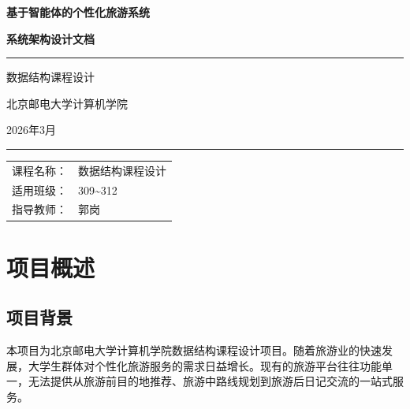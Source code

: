 \documentclass[12pt,a4paper]{report}
\begin{document}
\begin{titlepage}
\centering
\vspace*{3cm}

{\Huge\bfseries 基于智能体的个性化旅游系统}

\vspace{1.5cm}

{\LARGE\bfseries 系统架构设计文档}

\vspace{2cm}

\rule{\textwidth}{1pt}

\vspace{1cm}

{\Large 数据结构课程设计}

\vspace{0.5cm}

{\large 北京邮电大学计算机学院}

\vspace{0.3cm}

{\large 2026年3月}

\vspace{1cm}

\rule{\textwidth}{1pt}

\vspace{2cm}

{\large
\begin{tabular}{rl}
课程名称： & 数据结构课程设计 \\
适用班级： & 309\textasciitilde312 \\
指导教师： & 郭岗 \\
\end{tabular}
}

\end{titlepage}

\tableofcontents
\newpage

\chapter{项目概述}

\section{项目背景}

本项目为北京邮电大学计算机学院数据结构课程设计项目。随着旅游业的快速发展，大学生群体对个性化旅游服务的需求日益增长。现有的旅游平台往往功能单一，无法提供从旅游前目的地推荐、旅游中路线规划到旅游后日记交流的一站式服务。
\end{document}
